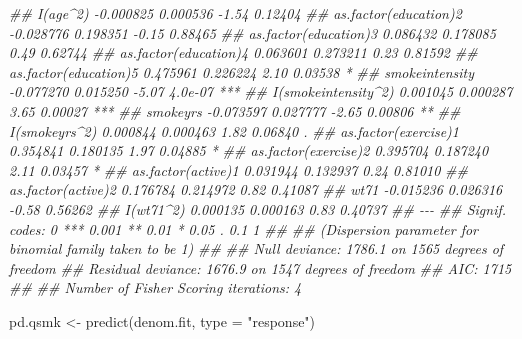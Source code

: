 \documentclass[
  10pt,
  a4paper,
]{book}
\newenvironment{Shaded}{\begin{snugshade}}{\end{snugshade}}
\newcommand{\AttributeTok}[1]{\textcolor[rgb]{0.40,0.45,0.13}{#1}}
\newcommand{\DocumentationTok}[1]{\textcolor[rgb]{0.37,0.37,0.37}{\textit{#1}}}
\newcommand{\FunctionTok}[1]{\textcolor[rgb]{0.28,0.35,0.67}{#1}}
\newcommand{\NormalTok}[1]{\textcolor[rgb]{0.00,0.46,0.62}{#1}}
\newcommand{\OtherTok}[1]{\textcolor[rgb]{0.00,0.46,0.62}{#1}}
\newcommand{\StringTok}[1]{\textcolor[rgb]{0.13,0.47,0.30}{#1}}
\begin{document}
\begin{Shaded}
\begin{Highlighting}[]
\DocumentationTok{\#\# I(age\^{}2)              {-}0.000825   0.000536   {-}1.54  0.12404    }
\DocumentationTok{\#\# as.factor(education)2 {-}0.028776   0.198351   {-}0.15  0.88465    }
\DocumentationTok{\#\# as.factor(education)3  0.086432   0.178085    0.49  0.62744    }
\DocumentationTok{\#\# as.factor(education)4  0.063601   0.273211    0.23  0.81592    }
\DocumentationTok{\#\# as.factor(education)5  0.475961   0.226224    2.10  0.03538 *  }
\DocumentationTok{\#\# smokeintensity        {-}0.077270   0.015250   {-}5.07  4.0e{-}07 ***}
\DocumentationTok{\#\# I(smokeintensity\^{}2)    0.001045   0.000287    3.65  0.00027 ***}
\DocumentationTok{\#\# smokeyrs              {-}0.073597   0.027777   {-}2.65  0.00806 ** }
\DocumentationTok{\#\# I(smokeyrs\^{}2)          0.000844   0.000463    1.82  0.06840 .  }
\DocumentationTok{\#\# as.factor(exercise)1   0.354841   0.180135    1.97  0.04885 *  }
\DocumentationTok{\#\# as.factor(exercise)2   0.395704   0.187240    2.11  0.03457 *  }
\DocumentationTok{\#\# as.factor(active)1     0.031944   0.132937    0.24  0.81010    }
\DocumentationTok{\#\# as.factor(active)2     0.176784   0.214972    0.82  0.41087    }
\DocumentationTok{\#\# wt71                  {-}0.015236   0.026316   {-}0.58  0.56262    }
\DocumentationTok{\#\# I(wt71\^{}2)              0.000135   0.000163    0.83  0.40737    }
\DocumentationTok{\#\# {-}{-}{-}}
\DocumentationTok{\#\# Signif. codes:  0 \textquotesingle{}***\textquotesingle{} 0.001 \textquotesingle{}**\textquotesingle{} 0.01 \textquotesingle{}*\textquotesingle{} 0.05 \textquotesingle{}.\textquotesingle{} 0.1 \textquotesingle{} \textquotesingle{} 1}
\DocumentationTok{\#\# }
\DocumentationTok{\#\# (Dispersion parameter for binomial family taken to be 1)}
\DocumentationTok{\#\# }
\DocumentationTok{\#\#     Null deviance: 1786.1  on 1565  degrees of freedom}
\DocumentationTok{\#\# Residual deviance: 1676.9  on 1547  degrees of freedom}
\DocumentationTok{\#\# AIC: 1715}
\DocumentationTok{\#\# }
\DocumentationTok{\#\# Number of Fisher Scoring iterations: 4}

\NormalTok{pd.qsmk }\OtherTok{\textless{}{-}} \FunctionTok{predict}\NormalTok{(denom.fit, }\AttributeTok{type =} \StringTok{"response"}\NormalTok{)}


\end{Highlighting}
\end{Shaded}
\end{document}
